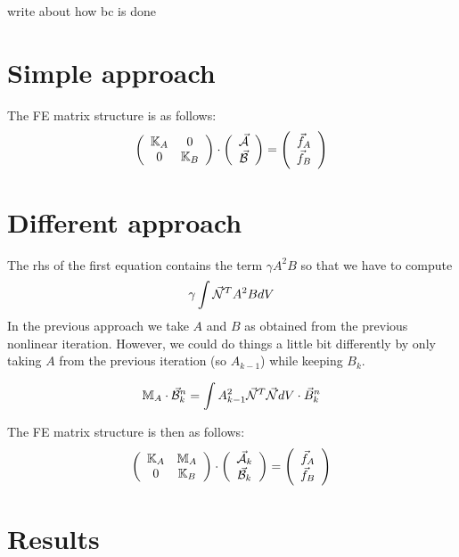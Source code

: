 {\color{red} write about how bc is done}

\section*{Simple approach} The FE matrix structure is as follows:
\[
\left(
\begin{array}{cc}
{\mathbb{K}}_A & 0 \\
0 & {\mathbb{K}}_B
\end{array}
\right)
\cdot
\left(
\begin{array}{c}
\vec{\cal A}\\
\vec{\cal B}
\end{array}
\right)
=
\left(
\begin{array}{c}
\vec{f}_A\\
\vec{f}_B
\end{array}
\right)
\]

\section*{Different approach} 
The rhs of the first equation contains the term $\gamma A^2B$
so that we have to compute
\[
\gamma \int \vec{\cal N}^T A^2 B dV
\]
In the previous approach we take $A$ and $B$ as obtained from the previous nonlinear iteration. 
However, we could do things a little bit differently by only taking $A$ from the previous iteration (so $A_{k-1}$)
while keeping $B_{k}$.

\[
{\mathbb{M}}_A \cdot \vec{\cal B}^n_k =  \int A_{k-1}^2 \vec{{\mathcal{N}}}^T \vec{{\mathcal{N}}} dV  \cdot \vec{B}_k^n
\]


The FE matrix structure is then as follows:
\[
\left(
\begin{array}{cc}
{\mathbb{K}}_A & {\mathbb{M}}_A \\
0 & {\mathbb{K}}_B
\end{array}
\right)
\cdot
\left(
\begin{array}{c}
\vec{\cal A}_k\\
\vec{\cal B}_k
\end{array}
\right)
=
\left(
\begin{array}{c}
\vec{f}_A\\
\vec{f}_B
\end{array}
\right)
\]


\section*{Results} 


